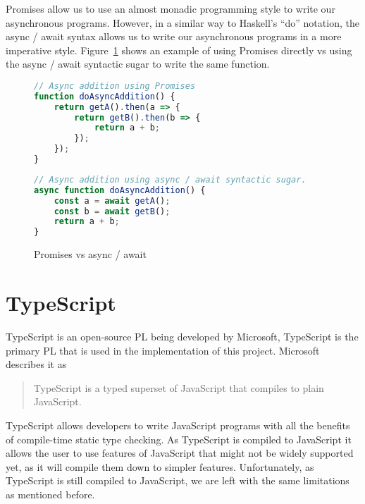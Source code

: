 Promises allow us to use an almost monadic programming style to write our asynchronous programs. However, in a similar way to Haskell's ``do'' notation, the async / await syntax allows us to write our asynchronous programs in a more imperative style. Figure~\ref{background:figure:async-await} shows an example of using Promises directly vs using the async / await syntactic sugar to write the same function.

\begin{figure}
    \caption{Promises vs async / await}
    \label{background:figure:async-await}
    \begin{minipage}[t]{0.45\textwidth}
        \begin{lstlisting}[language=javascript]
// Async addition using Promises
function doAsyncAddition() {
    return getA().then(a => {
        return getB().then(b => {
            return a + b;
        });
    });
}
        \end{lstlisting}
    \end{minipage}
    \begin{minipage}[t]{0.45\textwidth}
        \begin{lstlisting}[language=javascript]
// Async addition using async / await syntactic sugar.
async function doAsyncAddition() {
    const a = await getA();
    const b = await getB();
    return a + b;
}
        \end{lstlisting}
    \end{minipage}
\end{figure}

\section{TypeScript}
TypeScript is an open-source PL being developed by Microsoft, TypeScript is the primary PL that is used in the implementation of this project. Microsoft describes it as

\begin{quote}
TypeScript is a typed superset of JavaScript that compiles to plain JavaScript.\cite{microsoftts}
\end{quote}

TypeScript allows developers to write JavaScript programs with all the benefits of compile-time static type checking. As TypeScript is compiled to JavaScript it allows the user to use features of JavaScript that might not be widely supported yet, as it will compile them down to simpler features. Unfortunately, as TypeScript is still compiled to JavaScript, we are left with the same limitations as mentioned before.

